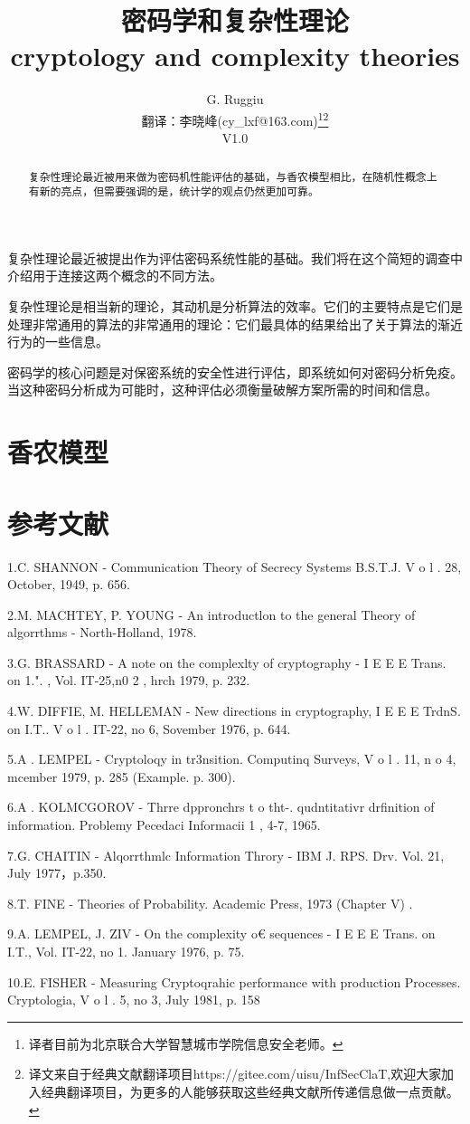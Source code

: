 \documentclass[]{article}
\title{密码学和复杂性理论\\
cryptology and complexity theories}
\author{G. Ruggiu \\
{\small  翻译：李晓峰(cy\_lxf@163.com)}\footnote{译者目前为北京联合大学智慧城市学院信息安全老师。}\footnote{译文来自于经典文献翻译项目https://gitee.com/uisu/InfSecClaT,欢迎大家加入经典翻译项目，为更多的人能够获取这些经典文献所传递信息做一点贡献。}\\
{\small  V1.0}
}
\begin{document}
	
	\maketitle
	
	\begin{abstract}
		复杂性理论最近被用来做为密码机性能评估的基础，与香农模型相比，在随机性概念上有新的亮点，但需要强调的是，统计学的观点仍然更加可靠。
	\end{abstract}


    复杂性理论最近被提出作为评估密码系统性能的基础。我们将在这个简短的调查中介绍用于连接这两个概念的不同方法。
    
    复杂性理论是相当新的理论，其动机是分析算法的效率。它们的主要特点是它们是处理非常通用的算法的非常通用的理论：它们最具体的结果给出了关于算法的渐近行为的一些信息。
    
    密码学的核心问题是对保密系统的安全性进行评估，即系统如何对密码分析免疫。当这种密码分析成为可能时，这种评估必须衡量破解方案所需的时间和信息。
    
	\section{香农模型}
	
	
	
	
	
	\section*{参考文献}
    1.C. SHANNON - Communication Theory of Secrecy Systems B.S.T.J. V o l . 28, October,
    1949, p. 656.\par
    2.M. MACHTEY, P. YOUNG - An introductlon to the general Theory of algorrthms -
    North-Holland, 1978.\par
    3.G. BRASSARD - A note on the complexlty of cryptography - I E E E Trans. on 1.". ,
    Vol. IT-25,n0 2 , hrch 1979, p. 232.\par
    4.W. DIFFIE, M. HELLEMAN - New directions in cryptography, I E E E TrdnS. on I.T..
    V o l . IT-22, no 6, Sovember 1976, p. 644.\par
    5.A . LEMPEL - Cryptoloqy in tr3nsition. Computinq Surveys, V o l . 11, n o 4, mcember
    1979, p. 285 (Example. p. 300).\par
    6.A . KOLMCGOROV - Thrre dppronchrs t o tht-. qudntitativr drfinition of information.
    Problemy Pecedaci Informacii 1 , 4-7, 1965.\par
    7.G. CHAITIN - Alqorrthmlc Information Throry - IBM J. RPS. Drv. Vol. 21, July 1977，p.350.\par
    8.T. FINE - Theories of Probability. Academic Press, 1973 (Chapter V) .\par
    9.A. LEMPEL, J. ZIV - On the complexity o€ sequences - I E E E Trans. on I.T.,
    Vol. IT-22, no 1. January 1976, p. 75.\par
    10.E. FISHER - Measuring Cryptoqrahic performance with production Processes.
    Cryptologia, V o l . 5, no 3, July 1981, p. 158\par
\end{document}
